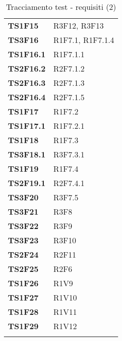 {\begin{minipage}[b]{.9\linewidth}
\begin{longtable}{C{2.5cm} | C{5cm} }
		\textbf{TS1F15} & R3F12, R3F13\\
		\textbf{TS3F16} & R1F7.1, R1F7.1.4\\
		\textbf{TS1F16.1} & R1F7.1.1\\
		\textbf{TS2F16.2} & R2F7.1.2\\
		\textbf{TS2F16.3} & R2F7.1.3\\				
		\textbf{TS2F16.4} & R2F7.1.5\\	
		\textbf{TS1F17} & R1F7.2\\
		\textbf{TS1F17.1} & R1F7.2.1\\
		\textbf{TS1F18} & R1F7.3\\
		\textbf{TS3F18.1} & R3F7.3.1\\
		\textbf{TS1F19} & R1F7.4\\
		\textbf{TS2F19.1} & R2F7.4.1\\
		\textbf{TS3F20} & R3F7.5\\
		\textbf{TS3F21} & R3F8\\
		\textbf{TS3F22} & R3F9\\
		\textbf{TS3F23} & R3F10\\
		\textbf{TS2F24} & R2F11\\
		\textbf{TS2F25} & R2F6\\
		\textbf{TS1F26} & R1V9\\
		\textbf{TS1F27} & R1V10\\
		\textbf{TS1F28} & R1V11\\
		\textbf{TS1F29} & R1V12\\
		
		\caption{Tracciamento test - requisiti (2)}
	\end{longtable}
\end{minipage}
}